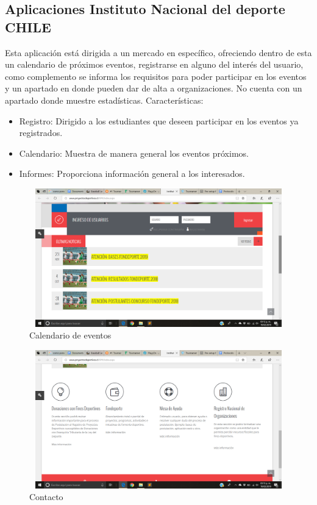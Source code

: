 \subsection{Aplicaciones Instituto Nacional del deporte CHILE}
\noindent Esta aplicación está dirigida a un mercado en específico, ofreciendo dentro de esta un calendario de próximos eventos, registrarse en alguno del interés del usuario, como complemento se informa los requisitos para poder participar en los eventos y  un apartado en donde pueden dar de alta a organizaciones. No cuenta con un apartado donde muestre estadísticas. \cite{IND}
Características: 
\begin{itemize}
	\item Registro: Dirigido a los estudiantes que deseen participar en los eventos ya registrados.
	\item Calendario: Muestra de manera general los eventos próximos.
	\item Informes: Proporciona información general a los interesados.
	
\end{itemize}
\begin{figure}[hbt!]
	\centering
	\includegraphics[width=12cm, height=6cm]{Imagenes/Aplicaciones/INDC1.png}
	\caption{Calendario de eventos}
\end{figure}
\begin{figure}[hbt!]
	\centering
	\includegraphics[width=12cm, height=6cm]{Imagenes/Aplicaciones/INDC2.png}
	\caption{Contacto}
\end{figure}
\pagebreak

